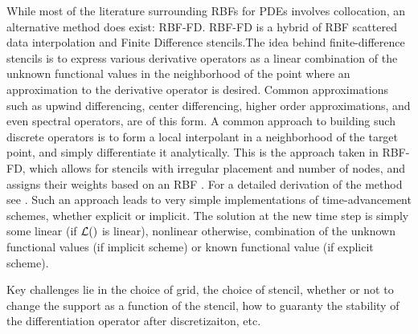 \documentclass{report}
\begin{document}
{While most of the literature surrounding RBFs for PDEs involves collocation, an alternative method does exist: RBF-FD. RBF-FD is a hybrid of RBF scattered data interpolation and Finite Difference stencils.The idea behind finite-difference stencils is to express various derivative operators as a linear combination of the unknown functional values in the neighborhood of the point where an approximation to the derivative operator is desired. Common approximations such as upwind differencing, center differencing, higher order approximations, and even spectral operators, are of this form. A common approach to building such discrete operators is to form a local interpolant in a neighborhood of the target point, and simply differentiate it analytically. This is the approach taken in RBF-FD,   which  allows for stencils with irregular placement and number of nodes, and assigns their weights based on an RBF \cite{Wright:2003}. For a detailed derivation of the method see \cite{Wright:2004, Wright:2003, Wright:2006, Chandhini:2007}. Such an approach leads to very simple implementations of time-advancement schemes, whether explicit or implicit. The solution at the new time step is simply some linear (if $\mathcal{L}()$ is linear), nonlinear otherwise, combination of the unknown functional values (if implicit scheme) or known functional value (if explicit scheme). 

Key challenges lie in the choice of grid, the choice of stencil, whether or not to change the support as a function of the stencil, how to guaranty the stability of the differentiation  operator after discretizaiton, etc. 



% 


}
\end{document}

